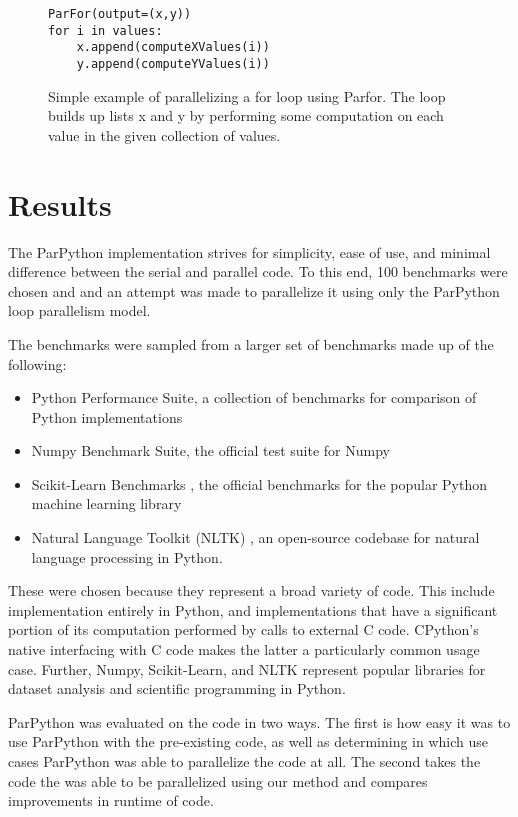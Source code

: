 \documentclass[conference]{IEEEtran}
\begin{document}
\begin{figure}[t]
\begin{lstlisting}[frame=single]
ParFor(output=(x,y))
for i in values:
    x.append(computeXValues(i))
    y.append(computeYValues(i))
\end{lstlisting}
\caption{Simple example of parallelizing a for loop using Parfor. The loop builds up lists x and y by performing some computation on each value in the given collection of values.}
\label{basicExample}
\end{figure}

\section{Results}

The ParPython implementation strives for simplicity, ease of use, and minimal difference between the serial and parallel code.
To this end, 100 benchmarks were chosen and and an attempt was made to parallelize it using only the ParPython loop parallelism model.

The benchmarks were sampled from a larger set of benchmarks made up of the following:
\begin{itemize}
   \item Python Performance Suite\cite{pyPerformance}, a collection of benchmarks for comparison of Python implementations
   \item Numpy Benchmark Suite\cite{numpyPerformance}, the official test suite for Numpy 
   \item Scikit-Learn Benchmarks \cite{scikit-learn}, the official benchmarks for the popular Python machine learning library
   \item Natural Language Toolkit (NLTK) \cite{bird_2016}, an 
   open-source codebase for natural language processing in Python.
\end{itemize}
These were chosen because they represent a broad variety of code. 
This include implementation entirely in Python, and implementations 
that have a significant portion of its computation performed by calls to external C code.
CPython's native interfacing with C code makes the latter a particularly common usage case.
Further, Numpy, Scikit-Learn, and NLTK represent popular libraries for dataset analysis and scientific programming in Python.


ParPython was evaluated on the code in two ways. The first is how
easy it was to use ParPython with the pre-existing code, as well as 
determining in which use cases ParPython was able to 
parallelize the code at all.
The second takes the code the was able to be parallelized using our method and compares improvements in runtime of code.
\end{document}
